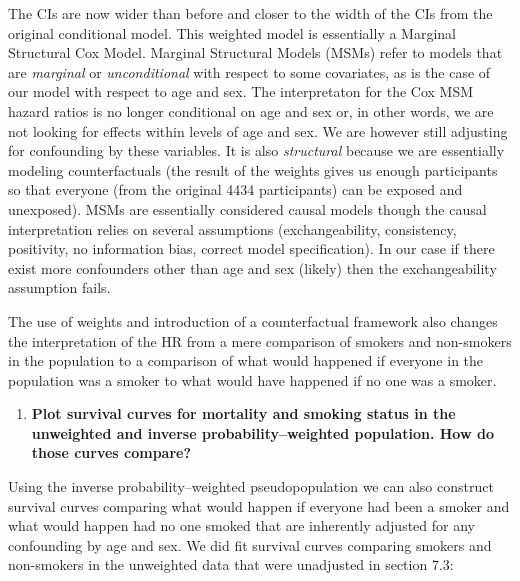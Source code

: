 \documentclass[
]{book}
\newenvironment{Shaded}{\begin{snugshade}}{\end{snugshade}}
\newcommand{\DataTypeTok}[1]{\textcolor[rgb]{0.13,0.29,0.53}{#1}}
\newcommand{\KeywordTok}[1]{\textcolor[rgb]{0.13,0.29,0.53}{\textbf{#1}}}
\newcommand{\NormalTok}[1]{#1}
\newcommand{\OperatorTok}[1]{\textcolor[rgb]{0.81,0.36,0.00}{\textbf{#1}}}
\newcommand{\StringTok}[1]{\textcolor[rgb]{0.31,0.60,0.02}{#1}}
\providecommand{\tightlist}{%
  \setlength{\itemsep}{0pt}\setlength{\parskip}{0pt}}
\begin{document}
The CIs are now wider than before and closer to the width of the CIs from the original conditional model. This weighted model is essentially a Marginal Structural Cox Model. Marginal Structural Models (MSMs) refer to models that are \emph{marginal} or \emph{unconditional} with respect to some covariates, as is the case of our model with respect to age and sex. The interpretaton for the Cox MSM hazard ratios is no longer conditional on age and sex or, in other words, we are not looking for effects within levels of age and sex. We are however still adjusting for confounding by these variables. It is also \emph{structural} because we are essentially modeling counterfactuals (the result of the weights gives us enough participants so that everyone (from the original 4434 participants) can be exposed and unexposed). MSMs are essentially considered causal models though the causal interpretation relies on several assumptions (exchangeability, consistency, positivity, no information bias, correct model specification). In our case if there exist more confounders other than age and sex (likely) then the exchangeability assumption fails.

The use of weights and introduction of a counterfactual framework also changes the interpretation of the HR from a mere comparison of smokers and non-smokers in the population to a comparison of what would happened if everyone in the population was a smoker to what would have happened if no one was a smoker.

\begin{enumerate}
\def\labelenumi{\arabic{enumi}.}
\setcounter{enumi}{1}
\tightlist
\item
  \textbf{Plot survival curves for mortality and smoking status in the unweighted and inverse probability--weighted population. How do those curves compare?}
\end{enumerate}

Using the inverse probability--weighted pseudopopulation we can also construct survival curves comparing what would happen if everyone had been a smoker and what would happen had no one smoked that are inherently adjusted for any confounding by age and sex. We did fit survival curves comparing smokers and non-smokers in the unweighted data that were unadjusted in section 7.3:

\begin{Shaded}
\end{Shaded}
\end{document}
